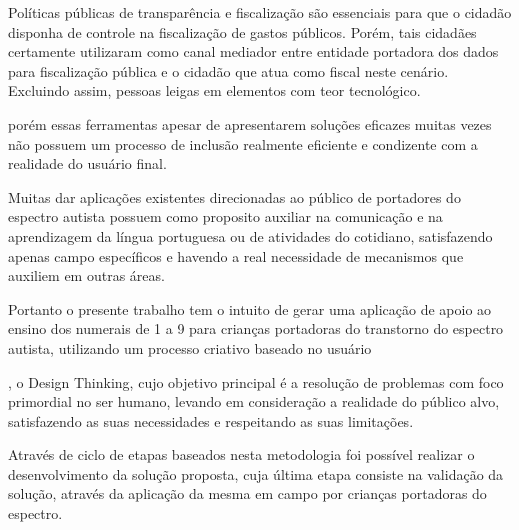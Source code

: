 Políticas públicas de transparência e fiscalização são essenciais para que o cidadão disponha de controle na fiscalização de gastos públicos. Porém, tais cidadães certamente utilizaram como canal mediador entre entidade portadora dos dados para fiscalização pública e o cidadão que atua como fiscal neste cenário. Excluindo assim, pessoas leigas em elementos com teor tecnológico.

porém essas ferramentas apesar de apresentarem soluções eficazes muitas vezes não possuem um processo de inclusão realmente eficiente e condizente com a realidade do usuário final. 

Muitas dar aplicações existentes direcionadas ao público de portadores do espectro autista possuem como proposito auxiliar na comunicação e na aprendizagem da língua portuguesa ou de atividades do cotidiano, satisfazendo apenas campo específicos e havendo a real necessidade de mecanismos que auxiliem em outras áreas.

Portanto o presente trabalho tem o intuito de gerar uma aplicação de apoio ao ensino dos numerais de 1 a 9 para crianças portadoras do transtorno do espectro autista, utilizando um processo criativo baseado no usuário

, o Design Thinking, cujo objetivo principal é a resolução de problemas com foco primordial no ser humano, levando em consideração a realidade do público alvo, satisfazendo as suas necessidades e respeitando as suas limitações.  

Através de ciclo de etapas baseados nesta metodologia foi possível realizar o desenvolvimento da solução proposta, cuja última etapa consiste na validação da solução, através da aplicação da mesma em campo por crianças portadoras do espectro.
